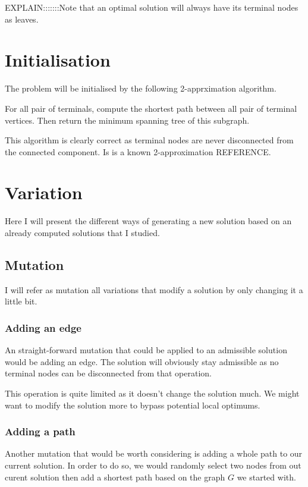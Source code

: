 \documentclass{article}
\theoremstyle{plain} %
\theoremstyle{definition} %
\begin{document}
EXPLAIN:::::::Note that an optimal solution will always have its terminal nodes
as leaves.

\section{Initialisation}

The problem will be initialised by the following 2-apprximation algorithm.

For all pair of terminals, compute the shortest path between all pair of
terminal vertices. Then return the minimum spanning tree of this subgraph.

This algorithm is clearly correct as terminal nodes are never disconnected from the connected component. Is is a known 2-approximation REFERENCE.

\section{Variation}

Here I will present the different ways of generating a new solution based on an
already computed solutions that I studied.

\subsection{Mutation}

I will refer as mutation all variations that modify a solution by only changing
it a little bit.

\subsubsection{Adding an edge}

An straight-forward mutation that could be applied to an admissible solution
would be adding an edge. The solution will obviously stay admissible as no
terminal nodes can be disconnected from that operation.

This operation is quite limited as it doesn't change the solution much. We
might want to modify the solution more to bypass potential local optimums.

\subsubsection{Adding a path}

Another mutation that would be worth considering is adding a whole path to
our current solution. In order to do so, we would randomly select two nodes
from out curent solution then add a shortest path based on the graph $G$ we
started with.
\end{document}
